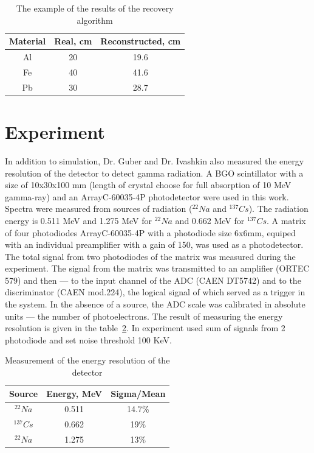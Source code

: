 \documentclass[a4paper]{panl}
\begin{document}
\begin{table}
    \caption{The example of the results of the recovery algorithm}
    \label{tab:rec}
\begin{center}
        \begin{tabular}[c]{|c|c|c|}
        \hline 
        Material & Real, cm & Reconstructed, cm \\ 
        \hline 
        Al & 20 & 19.6 \\ 
        \hline 
        Fe & 40 & 41.6 \\ 
        \hline 
        Pb & 30 & 28.7 \\ 
        \hline 
    \end{tabular}
\end{center}
\end{table}

\newpage
\section*{Experiment}
In addition to simulation, Dr. Guber and Dr. Ivashkin also measured the energy resolution of the detector to detect gamma radiation. A BGO scintillator with a size of 10x30x100 mm (length of crystal choose for full absorption of 10 MeV gamma-ray) and an ArrayC-60035-4P photodetector were used in this work. Spectra were measured from sources of radiation ($^{22}Na$ and $^{137}Cs$). The radiation energy is 0.511 MeV and 1.275 MeV for $^{22}Na$ and 0.662 MeV for $^{137}Cs$. A matrix of four photodiodes ArrayC-60035-4P with a photodiode size 6x6mm, equiped with an individual preamplifier with a gain of 150, was used as a photodetector. The total signal from two photodiodes of the matrix was measured during the experiment. The signal from the matrix was transmitted to an amplifier (ORTEC 579) and then --- to the input channel of the ADC (CAEN DT5742) and to the discriminator (CAEN mod.224), the logical signal of which served as a trigger in the system. In the absence of a source, the ADC scale was calibrated in absolute units --- the number of photoelectrons. The result of measuring the energy resolution is given in the table~\ref{tab:ex}. In experiment used sum of signals from 2 photodiode and set noise threshold 100 KeV.\\
\begin{table}
    \caption{Measurement of the energy resolution of the detector}
    \label{tab:ex}
    \begin{center} 
        \begin{tabular}[c]{|c|c|c|}
            \hline 
            Source & Energy, MeV & Sigma/Mean \\
            \hline 
            $^{22}Na$&0.511 & 14.7\%  \\ 
            \hline 
            $^{137}Cs$&0.662 & 19\%\\ 
            \hline 
            $^{22}Na$& 1.275 & 13\% \\
            \hline 
        \end{tabular} 
    \end{center}
\end{table}
\end{document}
